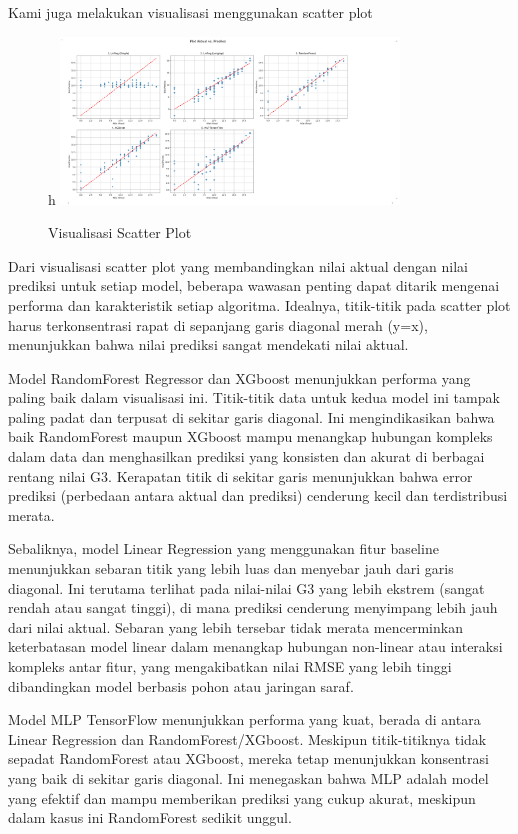 Kami juga melakukan visualisasi menggunakan scatter plot

\begin{figure}{h}
    \centering
    \includegraphics[width=0.8\textwidth]{images/scatter_plot.png}
    \caption{Visualisasi Scatter Plot}
    \label{fig:hasil}
\end{figure}

Dari visualisasi scatter plot yang membandingkan nilai aktual dengan nilai prediksi untuk setiap model, beberapa wawasan penting dapat ditarik 
mengenai performa dan karakteristik setiap algoritma. Idealnya, titik-titik pada scatter plot harus terkonsentrasi rapat di sepanjang garis 
diagonal merah (y=x), menunjukkan bahwa nilai prediksi sangat mendekati nilai aktual.

Model RandomForest Regressor dan XGboost menunjukkan performa yang paling baik dalam visualisasi ini. Titik-titik data 
untuk kedua model ini tampak paling padat dan terpusat di sekitar garis diagonal. Ini mengindikasikan bahwa baik RandomForest maupun XGboost mampu 
menangkap hubungan kompleks dalam data dan menghasilkan prediksi yang konsisten dan akurat di berbagai rentang nilai G3. Kerapatan titik di 
sekitar garis menunjukkan bahwa error prediksi (perbedaan antara aktual dan prediksi) cenderung kecil dan terdistribusi merata.

Sebaliknya, model Linear Regression yang menggunakan fitur baseline menunjukkan sebaran titik yang lebih luas dan menyebar jauh 
dari garis diagonal. Ini terutama terlihat pada nilai-nilai G3 yang lebih ekstrem (sangat rendah atau sangat tinggi), di mana prediksi cenderung 
menyimpang lebih jauh dari nilai aktual. Sebaran yang lebih tersebar tidak merata mencerminkan keterbatasan model linear dalam menangkap hubungan 
non-linear atau interaksi kompleks antar fitur, yang mengakibatkan nilai RMSE yang lebih tinggi dibandingkan model berbasis pohon atau jaringan 
saraf.

Model MLP TensorFlow menunjukkan performa yang kuat, berada di antara Linear Regression dan RandomForest/XGboost. Meskipun titik-titiknya tidak 
sepadat RandomForest atau XGboost, mereka tetap menunjukkan konsentrasi yang baik di sekitar garis diagonal. Ini menegaskan bahwa MLP adalah 
model yang efektif dan mampu memberikan prediksi yang cukup akurat, meskipun dalam kasus ini RandomForest sedikit unggul.

